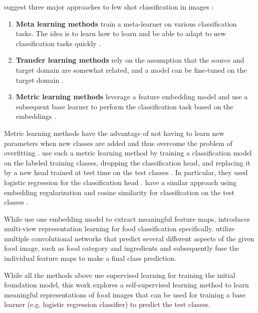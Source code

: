 \citeauthor{li_deep_2023} suggest three major approaches to few shot classification in images \cite{li_deep_2023}:
\begin{enumerate}
	\item{\textbf{Meta learning methods} train a meta-learner on various classification tasks. The idea is to learn
	how to learn and be able to adapt to new classification tasks quickly \cite{li_deep_2023}.}
	\item{\textbf{Transfer learning methods} rely on the assumption that the source and target domain are 
	somewhat related, and a model can be fine-tuned on the target domain \cite{li_deep_2023}.}
	\item{\textbf{Metric learning methods} leverage a feature embedding model and use a subsequent base learner 
	to perform the classification task based on the embeddings \cite{li_deep_2023}.}
\end{enumerate}

Metric learning methods have the advantage of not having to learn new parameters when new classes are added 
and thus overcome the problem of overfitting \cite{li_deep_2023}. \citeauthor{tian_rethinking_2020} use such a metric learning method by training a classification model on the labeled training classes, 
dropping the classification head, and replacing it by a new head trained at test time on the test classes \cite{tian_rethinking_2020}. In particular, they used logistic regression for the classification head \cite{tian_rethinking_2020}. 
\citeauthor{dhillon_baseline_2020} have a similar approach using embedding regularization and cosine similarity 
for classification on the test classes \cite{dhillon_baseline_2020}.

While \cite{tian_rethinking_2020, dhillon_baseline_2020} use one embedding model to extract meaningful feature maps, 
\cite{jiang_few-shot_2020} introduces multi-view representation learning for food classification specifically.
\citeauthor{jiang_few-shot_2020} utilize multiple convolutional networks that predict several different aspects 
of the given food image, such as food category and ingredients and subsequently fuse the individual feature maps to 
make a final class prediction.

While all the methods above use supervised learning for training the initial foundation model, this work 
explores a self-supervised learning method to learn meaningful representations of food images that can 
be used for training a base learner (e.g. logistic regression classifier) to predict the test classes.

